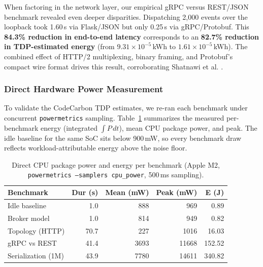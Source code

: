 \documentclass[conference]{IEEEtran}
\begin{document}
When factoring in the network layer, our empirical gRPC versus REST/JSON benchmark revealed even deeper disparities. Dispatching 2,000 events over the loopback took 1.60\,s via Flask/JSON but only 0.25\,s via gRPC/Protobuf. This \textbf{84.3\% reduction in end-to-end latency} corresponds to an \textbf{82.7\% reduction in TDP-estimated energy} (from $9.31\times10^{-5}$\,kWh to $1.61\times10^{-5}$\,kWh).
 The combined effect of HTTP/2 multiplexing, binary framing, and Protobuf's compact wire format drives this result, corroborating Shatnawi et al. \cite{b6}.

\subsubsection{Direct Hardware Power Measurement}
\label{sec:hw_power}

To validate the CodeCarbon TDP estimates, we re-ran each benchmark under concurrent \texttt{powermetrics} sampling. Table~\ref{tab:hw_power} summarizes the measured per-benchmark energy (integrated $\int P\,dt$), mean CPU package power, and peak. The idle baseline for the same SoC sits below 900\,mW, so every benchmark draw reflects workload-attributable energy above the noise floor.

\begin{table}[htbp]
\caption{Direct CPU package power and energy per benchmark (Apple M2, \texttt{powermetrics --samplers cpu\_power}, 500\,ms sampling).}
\label{tab:hw_power}
\centering
\renewcommand{\arraystretch}{1.15}
\setlength{\tabcolsep}{4pt}
\begin{tabular}{|l|r|r|r|r|}
\hline
\textbf{Benchmark} & \textbf{Dur (s)} & \textbf{Mean (mW)} & \textbf{Peak (mW)} & \textbf{E (J)} \\
\hline
Idle baseline        &   1.0 &   888 &    969 &   0.89 \\
Broker model         &   1.0 &   814 &    949 &   0.82 \\
Topology (HTTP)      &  70.7 &   227 &   1016 &  16.03 \\
gRPC vs REST         &  41.4 &  3693 &  11668 & 152.52 \\
Serialization (1M)   &  43.9 &  7780 &  14611 & 340.82 \\
\hline
\end{tabular}
\end{table}
\end{document}
